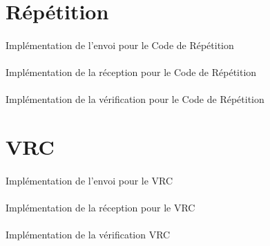     \section{Répétition}

        \paragraph{}
Implémentation de l'envoi pour le Code de Répétition


    \clearpage
        \paragraph{}
Implémentation de la réception pour le Code de Répétition


    \clearpage
        \paragraph{}
Implémentation de la vérification pour le Code de Répétition


    \clearpage


    \section{VRC}

        \paragraph{}
Implémentation de l'envoi pour le VRC


    \clearpage
        \paragraph{}
Implémentation de la réception pour le VRC


    \clearpage
        \paragraph{}
Implémentation de la vérification VRC


    \clearpage


